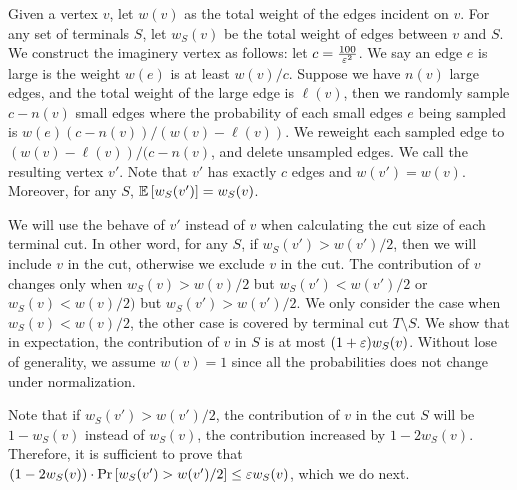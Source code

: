 \iffalse
Given a vertex $v$, let $w(v)$ as the total weight of the edges incident on $v$. For any set of terminals $S$, let $w_S(v)$ be the total weight of edges between $v$ and $S$. We construct the imaginery vertex as follows: let $c = \frac{100}{{\varepsilon}^2}$. We say an edge $e$ is large is the weight $w(e)$ is at least $w(v)/c$. Suppose we have $n(v)$ large edges, and the total weight of the large edge is $\ell(v)$, then we randomly sample $c-n(v)$ small edges where the probability of each small edges $e$ being sampled is $w(e)(c-n(v))/(w(v)-\ell(v))$. We reweight each sampled edge to $(w(v)-\ell(v))/(c-n(v)$, and delete unsampled edges. We call the resulting vertex $v'$. Note that $v'$ has exactly $c$ edges and $w(v')=w(v)$. Moreover, for any $S$, ${\mathbb{E}}\left[ w_S(v') \right]=w_S(v)$.

We will use the behave of $v'$ instead of $v$ when calculating the cut size of each terminal cut. In other word, for any $S$, if $w_S(v')>w(v')/2$, then we will include $v$ in the cut, otherwise we exclude $v$ in the cut. The contribution of $v$ changes only when $w_S(v)>w(v)/2$ but $w_S(v')<w(v')/2$ or $w_S(v)<w(v)/2)$ but $w_S(v')>w(v')/2$. We only consider the case when $w_S(v)<w(v)/2$, the other case is covered by terminal cut $T \setminus S$. We show that in expectation, the contribution of $v$ in $S$ is at most $(1+{\varepsilon})w_S(v)$. Without lose of generality, we assume $w(v) = 1$ since all the probabilities does not change under normalization.

Note that if $w_S(v')>w(v')/2$, the contribution of $v$ in the cut $S$ will be $1-w_S(v)$ instead of $w_S(v)$, the contribution increased by $1-2w_S(v)$. Therefore, it is sufficient to prove that $(1-2w_S(v)) \cdot \mathrm{Pr}\left[ w_S(v')>w(v')/2 \right] \le {\varepsilon} w_S(v)$, which we do next. 

